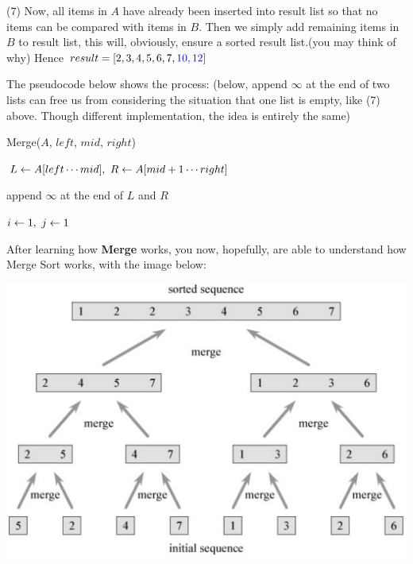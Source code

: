 \documentclass[11pt, a4paper]{COMP3711}
\begin{document}
\begin{spacing}{1.5}
    (7) Now, all items in $A$ have already been inserted into result 
    list so that no items can be compared with items in $B$.
    Then we simply add remaining items in $B$ to result list,
    this will, obviously, ensure a sorted result list.(you may think of why)
    Hence $result=[2,3,4,5,6,7,{\color{blue} 10,12}]$

    The pseudocode below shows the process:
    (below, append $\infty$ at the end of two lists can 
    free us from considering the situation that one list is 
    empty, like (7) above. Though different implementation, 
    the idea is entirely the same)
    
    \begin{algorithm*}
        \caption{Merge($A$, $left$, $mid$, $right$)}
        $L\leftarrow A[left\cdots mid],\ R\leftarrow A[mid+1\cdots right]$

        append $\infty$ at the end of $L$ and $R$ \qquad {}

        $i\leftarrow 1,\ j\leftarrow 1$\qquad  {}

         {
        }
    \end{algorithm*}

    After learning how {\bf Merge} works, you now, hopefully,
    are able to understand how Merge Sort works, with the image below:

    \begin{center}
        \includegraphics[scale=0.2]{images/02-mergeSort.jpeg}
    \end{center}
    

\end{spacing}
\end{document}
